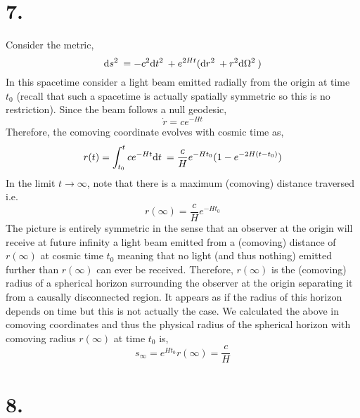 \documentclass[12pt]{article}
\begin{document}
\section*{7.}

Consider the metric,
\[ \mathrm{d}s^2 \: = - c^2 \mathrm{d}t^2 \: + e^{2 H t} ( \mathrm{d}r^2 \: + r^2 \mathrm{d}\Omega^2 \: ) \]
In this spacetime consider a light beam emitted radially from the origin at time $t_0$ (recall that such a spacetime is actually spatially symmetric so this is no restriction). Since the beam follows a null geodesic,
\[ \dot{r} = c e^{-H t} \]
Therefore, the comoving coordinate evolves with cosmic time as,
\[ r(t) = \int_{t_0}^t c e^{-H t} \mathrm{d}t \: = \frac{c}{H} e^{- H t_0} (1 - e^{-2 H (t - t_0)}) \]
In the limit $t \to \infty$, note that there is a maximum (comoving) distance traversed i.e.
\[ r(\infty) = \frac{c}{H} e^{-H t_0} \]
The picture is entirely symmetric in the sense that an observer at the origin will receive at future infinity a light beam emitted from a (comoving) distance of $r(\infty)$ at cosmic time $t_0$ meaning that no light (and thus nothing) emitted further than $r(\infty)$ can ever be received. Therefore, $r(\infty)$ is the (comoving) radius of a spherical horizon surrounding the observer at the origin separating it from a causally disconnected region. It appears as if the radius of this horizon depends on time but this is not actually the case. We calculated the above in comoving coordinates and thus the physical radius of the spherical horizon with comoving radius $r(\infty)$ at time $t_0$ is,
\[ s_\infty = e^{H t_0} r(\infty) = \frac{c}{H} \]

\section*{8.}
\end{document}
